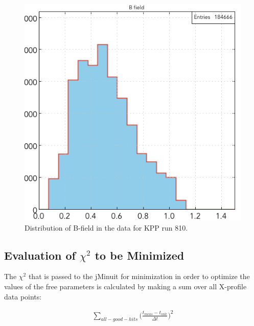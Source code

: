 \documentclass[12pt,epsfig]{article}
\begin{document}
\begin{figure}
    \centering
    \includegraphics[width=1.0\textwidth]{Figures/bField_KPP_Run810.png}
    \caption{Distribution of B-field in the data for KPP run 810.}
    \label{fBfieldDist}
\end{figure}




\subsection{Evaluation of $\chi^2$ to be Minimized}
\label{ssChisqEval}
The $\chi^2$ that is passed to the jMinuit for minimization in order to optimize the values of the free parameters is calculated by making a sum over all X-profile data points:

\begin{equation}
\label{eqChiSq}
\begin{aligned}
  \sum_{all-good-hits}^{}  \Bigg(   \frac{t_{meas} - t_{calc}}{ \Delta t} \Bigg)^2
\end{aligned}
\end{equation}
\end{document}
